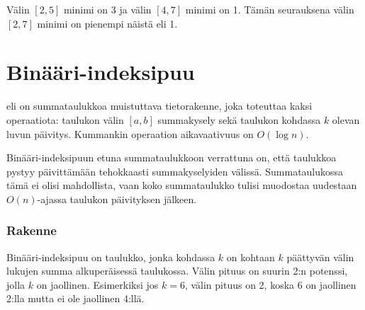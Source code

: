 Välin $[2,5]$ minimi on 3 ja välin $[4,7]$ minimi on 1.
Tämän seurauksena välin $[2,7]$ minimi on pienempi näistä eli 1.
% 

\section{Binääri-indeksipuu}


 eli  on
summataulukkoa muistuttava tietorakenne,
joka toteuttaa kaksi operaatiota:
taulukon välin $[a,b]$ summakysely
sekä taulukon kohdassa $k$ olevan luvun päivitys.
Kummankin operaation aikavaativuus on $O(\log n)$.

Binääri-indeksipuun etuna summataulukkoon verrattuna on,
että taulukkoa pystyy päivittämään tehokkaasti
summakyselyiden välissä.
Summataulukossa tämä ei olisi mahdollista,
vaan koko summataulukko tulisi muodostaa uudestaan $O(n)$-ajassa
taulukon päivityksen jälkeen.

\subsubsection{Rakenne}

Binääri-indeksipuu on taulukko, jonka
kohdassa $k$ on kohtaan $k$ päättyvän välin lukujen summa
alkuperäisessä taulukossa.
Välin pituus on suurin 2:n potenssi, jolla $k$ on jaollinen.
Esimerkiksi jos $k=6$, välin pituus on 2, koska
6 on jaollinen 2:lla mutta ei ole jaollinen 4:llä.

